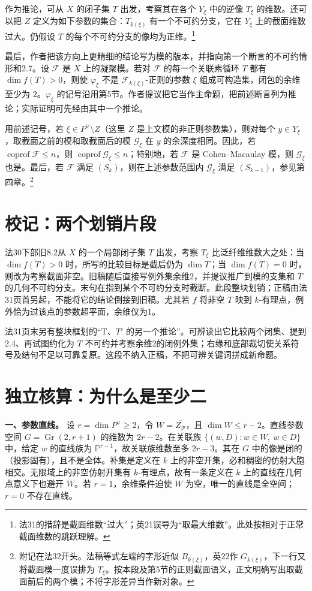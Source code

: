 \documentclass[openany,fontset=fandol]{ctexbook}
\DeclareMathOperator{\Gr}{Gr}
\DeclareMathOperator{\coprof}{coprof}
\begin{document}
作为推论，可从 $X$ 的闭子集 $T$ 出发，考察其在各个 $Y_\xi$ 中的逆像 $T_\xi$ 的维数。还可以把 $Z$ 定义为如下参数的集合：$T_{k(\xi)}$ 有一个不可约分支，它在 $Y_\xi$ 上的截面维数过大。仍假设 $T$ 的每个不可约分支的像均为正维。\footnote{法31的措辞是截面维数“过大”；英21误导为“取最大维数”。此处按相对于正常截面维数的跳跃理解。}

最后，作者把该方向上更精细的结论写为模的版本，并指向第一个断言的不可约情形和2.7。设 $\mathcal F$ 是 $X$ 上的凝聚模。若对 $\mathcal F$ 的每一个关联素循环 $T$ 都有 $\dim f(T)>0$，则使 $\varphi_\xi$ 不是 $\mathcal F_{k(\xi)}$-正则的参数 $\xi$ 组成可构造集，闭包的余维至少为 $2$。$\varphi_\xi$ 的记号沿用第5节。作者提议把它当作主命题，把前述断言列为推论；实际证明可先经由其中一个推论。

用前述记号，若 $\xi\in P^\vee\setminus Z$（这里 $Z$ 是上文模的非正则参数集），则对每个 $y\in Y_\xi$，取截面之前的模和取截面后的模 $\mathcal G_\xi$ 在 $y$ 的余深度相同。因此，若 $\coprof\mathcal F\le n$，则 $\coprof\mathcal G_\xi\le n$；特别地，若 $\mathcal F$ 是 Cohen--Macaulay 模，则 $\mathcal G_\xi$ 也是。最后，若 $\mathcal F$ 满足 $(S_k)$，则在上述参数范围内 $\mathcal G_\xi$ 满足 $(S_{k-1})$，参见第四章。\footnote{附记在法32开头。法稿等式左端的字形近似 $B_{k(\xi)}$，英22作 $G_{k(\xi)}$，下一行又将截面模一度误排为 $T_\xi$。按本段及第5节的正则截面语义，正文明确写出取截面前后的两个模；不将字形差异当作新对象。}
\section*{校记：两个划销片段}
法30下部旧8.2从 $X$ 的一个局部闭子集 $T$ 出发，考察 $T_\xi$ 比泛纤维维数大之处：当 $\dim\overline{f(T)}>0$ 时，所写的比较目标是截后仍为 $\dim T$；当 $\dim\overline{f(T)}=0$ 时，则改为考察截面非空。旧稿随后直接写例外集余维2，并提议推广到模的支集和 $T$ 的几何不可约分支。末句在指到某个不可约分支时截断。此段整块划销；正稿由法31页首另起，不能将它的结论倒接到旧稿。尤其若 $f$ 将非空 $T$ 映到 $k$-有理点，例外恰为过该点的参数超平面，余维仅为1。

法31页末另有整块框划的“T、$T'$ 的另一个推论”。可辨读出它比较两个闭集、提到2.4、再试图约化为 $T$ 不可约并考察余维2的闭例外集；右缘和底部裁切使关系符号及结句不足以可靠复原。这段不纳入正稿，不把可辨关键词拼成新命题。
\section*{独立核算：为什么是至少二}
\textbf{一、参数直线。}
设 $r=\dim P^\vee\ge2$，令 $W=\overline{Z_{\mathcal P}}$，且 $\dim W\le r-2$。直线参数空间 $G=\Gr(2,r+1)$ 的维数为 $2r-2$。在关联族 $\{(w,D):w\in W,\ w\in D\}$ 中，给定 $w$ 的直线族为 $\mathbb P^{r-1}$，故关联族维数至多 $2r-3$。其在 $G$ 中的像是闭的（投影固有），且不是全体。补集是定义在 $k$ 上的非空开集，必和稠密的仿射大胞相交。无限域上的非空仿射开集有 $k$-有理点，故有一条定义在 $k$ 上的直线在几何点意义下也避开 $W$。若 $r=1$，余维条件迫使 $W$ 为空，唯一的直线是全空间；$r=0$ 不存在直线。
\end{document}
